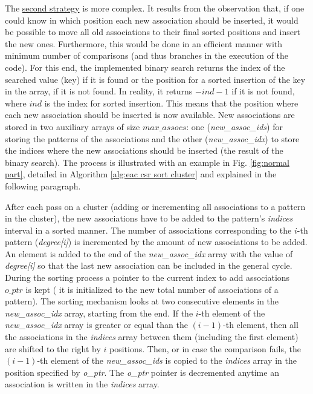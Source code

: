 The \underline{second strategy} is more complex.
It results from the observation that, if one could know in which position each new association should be inserted, it would be possible to move all old associations to their final sorted positions and insert the new ones.
Furthermore, this would be done in an efficient manner with minimum number of comparisons (and thus branches in the execution of the code).
For this end, the implemented binary search returns the index of the searched value (key) if it is found or the position for a sorted insertion of the key in the array, if it is not found.
In reality, it returns $-ind -1$ if it is not found, where $ind$ is the index for sorted insertion.
This means that the position where each new association should be inserted is now available.
New associations are stored in two auxiliary arrays of size $max\_assocs$: one (\emph{new\_assoc\_ids}) for storing the patterns of the associations and the other (\emph{new\_assoc\_idx}) to store the indices where the new associations should be inserted (the result of the binary search).
The process is illustrated with an example in Fig. \ref{fig:normal part}, detailed in Algorithm \ref{alg:eac csr sort cluster} and explained in the following paragraph.

After each pass on a cluster (adding or incrementing all associations to a pattern in the cluster), the new associations have to be added to the pattern's \emph{indices} interval in a sorted manner.
The number of associations corresponding to the $i$-th pattern (\emph{degree[i]}) is incremented by the amount of new associations to be added.
An element is added to the end of the \emph{new\_assoc\_idx} array with the value of \emph{degree[i]} so that the last new association can be included in the general cycle.
During the sorting process a pointer to the current index to add associations $o\_ptr$ is kept ( it is initialized to the new total number of associations of a pattern).
The sorting mechanism looks at two consecutive elements in the \emph{new\_assoc\_idx} array, starting from the end.
If the $i$-th element of the \emph{new\_assoc\_idx} array is greater or equal than the $(i-1)$-th element, then all the associations in the \emph{indices} array between them (including the first element) are shifted to the right by $i$ positions. %
Then, or in case the comparison fails, the $(i-1)$-th element of the \emph{new\_assoc\_ids} is copied to the \emph{indices} array in the position specified by \emph{o\_ptr}.
The \emph{o\_ptr} pointer is decremented anytime an association is written in the \emph{indices} array.

